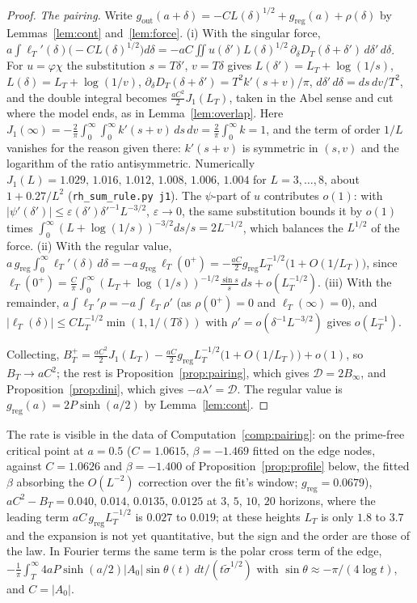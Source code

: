 \documentclass[11pt]{article}
\theoremstyle{definition}
\theoremstyle{remark}
\begin{document}
\begin{proof}
\emph{The pairing.} Write $g_{\mathrm{out}}(a+\delta)=-CL(\delta)^{1/2}+g_{\mathrm{reg}}(a)+\rho(\delta)$ by Lemmas~\ref{lem:cont} and~\ref{lem:force}. (i) With the singular force, $a\int\ell_T'(\delta)\big(-CL(\delta)^{1/2}\big)d\delta=-aC\iint u(\delta')L(\delta)^{1/2}\,\partial_\delta D_T(\delta+\delta')\,d\delta'\,d\delta$. For $u=\varphi\chi$ the substitution $s=T\delta'$, $v=T\delta$ gives $L(\delta')=L_T+\log(1/s)$, $L(\delta)=L_T+\log(1/v)$, $\partial_\delta D_T(\delta+\delta')=T^2k'(s+v)/\pi$, $d\delta'\,d\delta=ds\,dv/T^2$, and the double integral becomes $\frac{aC^2}2J_1(L_T)$, taken in the Abel sense and cut where the model ends, as in Lemma~\ref{lem:overlap}. Here $J_1(\infty)=-\frac2\pi\int_0^\infty\!\int_0^\infty k'(s+v)\,ds\,dv=\frac2\pi\int_0^\infty k=1$, and the term of order $1/L$ vanishes for the reason given there: $k'(s+v)$ is symmetric in $(s,v)$ and the logarithm of the ratio antisymmetric. Numerically $J_1(L)=1.029,\,1.016,\,1.012,\,1.008,\,1.006,\,1.004$ for $L=3,\dots,8$, about $1+0.27/L^2$ (\texttt{rh\_sum\_rule.py j1}). The $\psi$-part of $u$ contributes $o(1)$: with $|\psi'(\delta')|\le\varepsilon(\delta')\delta'^{-1}L^{-3/2}$, $\varepsilon\to0$, the same substitution bounds it by $o(1)$ times $\int_0^\infty(L+\log(1/s))^{-3/2}ds/s=2L^{-1/2}$, which balances the $L^{1/2}$ of the force. (ii) With the regular value, $a\,g_{\mathrm{reg}}\int_0^\infty\ell_T'(\delta)\,d\delta=-a\,g_{\mathrm{reg}}\,\ell_T(0^+)=-\frac{aC}2g_{\mathrm{reg}}L_T^{-1/2}\big(1+O(1/L_T)\big)$, since $\ell_T(0^+)=\frac C\pi\int_0^\infty(L_T+\log(1/s))^{-1/2}\frac{\sin s}s\,ds+o(L_T^{-1/2})$. (iii) With the remainder, $a\int\ell_T'\rho=-a\int\ell_T\rho'$ (as $\rho(0^+)=0$ and $\ell_T(\infty)=0$), and $|\ell_T(\delta)|\le CL_T^{-1/2}\min(1,1/(T\delta))$ with $\rho'=o(\delta^{-1}L^{-3/2})$ gives $o(L_T^{-1})$.

Collecting, $B_T^+=\frac{aC^2}2J_1(L_T)-\frac{aC}2g_{\mathrm{reg}}L_T^{-1/2}\big(1+O(1/L_T)\big)+o(1)$, so $B_T\to aC^2$; the rest is Proposition~\ref{prop:pairing}, which gives $\mathcal D=2B_\infty$, and Proposition~\ref{prop:dini}, which gives $-a\lambda'=\mathcal D$. The regular value is $g_{\mathrm{reg}}(a)=2P\sinh(a/2)$ by Lemma~\ref{lem:cont}.
\end{proof}

The rate is visible in the data of Computation~\ref{comp:pairing}: on the prime-free critical point at $a=0.5$ ($C=1.0615$, $\beta=-1.469$ fitted on the edge nodes, against $C=1.0626$ and $\beta=-1.400$ of Proposition~\ref{prop:profile} below, the fitted $\beta$ absorbing the $O(L^{-2})$ correction over the fit's window; $g_{\mathrm{reg}}=0.0679$), $aC^2-B_T=0.040,\,0.014,\,0.0135,\,0.0125$ at $3$, $5$, $10$, $20$ horizons, where the leading term $aC\,g_{\mathrm{reg}}L_T^{-1/2}$ is $0.027$ to $0.019$; at these heights $L_T$ is only $1.8$ to $3.7$ and the expansion is not yet quantitative, but the sign and the order are those of the law. In Fourier terms the same term is the polar cross term of the edge, $-\frac1\pi\int_T^\infty 4aP\sinh(a/2)|A_0|\sin\theta(t)\,dt/(t\tilde\sigma^{1/2})$ with $\sin\theta\approx-\pi/(4\log t)$, and $C=|A_0|$.
\end{document}
